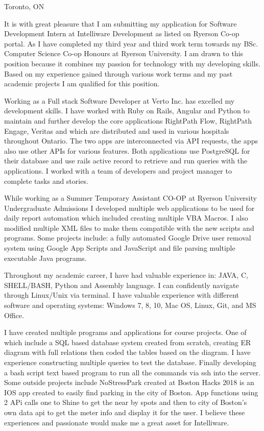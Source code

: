 \cvsection{}
\begin{cvletter}
 {Toronto, ON}
 
It is with great pleasure that I am submitting my application for Software Development Intern at Intelliware Development as listed on Ryerson Co-op portal. As I have completed my third year and third work term towards my BSc. Computer Science Co-op Honours at Ryerson University. I am drawn to this position because it combines my passion for technology with my developing skills. Based on my experience gained through various work terms and my past academic projects I am qualified for this position.

Working as a Full stack Software Developer at Verto Inc. has excelled my development skills. I have worked with Ruby on Rails, Angular and Python to maintain and further develop the core applications RightPath Flow, RightPath Engage, Veritas and which are distributed and used in various hospitals throughout Ontario. The two apps are interconnected via API requests, the apps also use other APIs for various features. Both applications use PostgreSQL for their database and use rails active record to retrieve and run queries with the applications. I worked with a team of developers and project manager to complete tasks and stories.

While working as a Summer Temporary Assistant CO-OP at Ryerson University Undergraduate Admissions I developed multiple web applications to be used for daily report automation which included creating multiple VBA Macros. I also modified multiple XML files to make them compatible with the new scripts and programs. Some projects include: a fully automated Google Drive user removal system using Google App Scripts and JavaScript and file parsing multiple executable Java programs.

Throughout my academic career, I have had valuable experience in: JAVA, C, SHELL/BASH, Python and Assembly
language. I can confidently navigate through Linux/Unix via terminal. I have valuable experience with different software and operating systems: Windows 7, 8, 10, Mac OS, Linux, Git, and MS Office. 

I have created multiple programs and applications for course projects. One of which include a SQL based database system created from scratch, creating ER diagram with full relations then coded the tables based on the diagram. I have experience constructing multiple queries to test the database. Finally developing a bash script text based program to run all the commands via ssh into the server. Some outside projects include NoStressPark created at Boston Hacks 2018 is an IOS app created to easily find parking in the city of Boston. App functions using 2 APi calls one to Shine to get the near by spots and then to city of Boston's own data api to get the meter info and display it for the user. I believe
these experiences and passionate would make me a great asset for Intelliware.

\CVend
\end{cvletter}